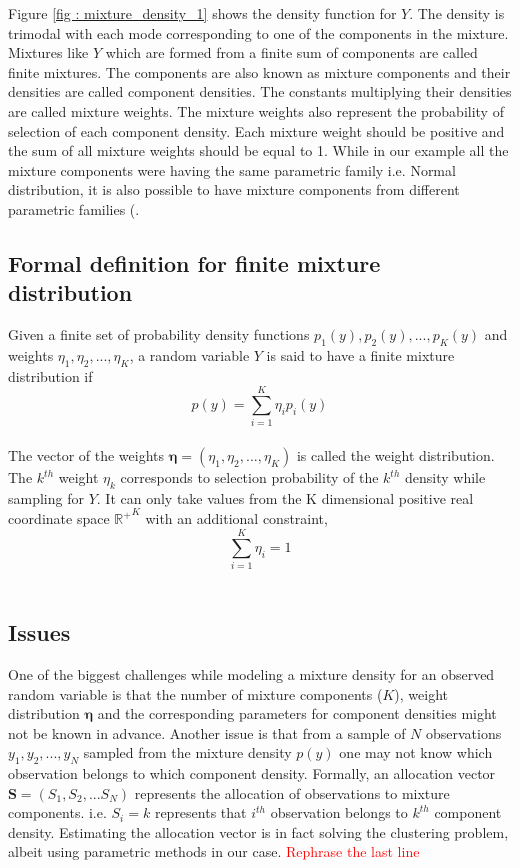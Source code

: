 Figure \ref{fig : mixture_density_1} shows the density function for $Y$. The density is trimodal with each mode corresponding to one of the components in the mixture. Mixtures like $Y$ which are formed from a finite sum of components are called finite mixtures. The components are also known as mixture components and their densities are called component densities. The constants multiplying their densities are called mixture weights. The mixture weights also represent the probability of selection of each component density. Each mixture weight should be positive and the sum of all mixture weights should be equal to 1. While in our example all the  mixture components were having the same parametric family i.e. Normal distribution, it is also possible to have mixture components from different parametric families (\citealp[pg. 4]{fruhwirth-schnatter_finite_2013}. 

\subsection{Formal definition for finite mixture distribution}
Given a finite set of probability density functions $p_1(y), p_2(y), ... , p_K(y)$ and weights $\eta_1, \eta_2, ... , \eta_K$, a random variable $Y$ is said to have a finite mixture distribution if\\
$$p(y) = \sum_{i=1}^{K} \eta_{i} p_{i}(y)$$\\
The vector of the weights $\boldsymbol{\eta} = (\eta_1, \eta_2, ... , \eta_K)$ is called the weight distribution. The $k^{th}$ weight $\eta_{k}$ corresponds to selection probability of the $k^{th}$ density while sampling for $Y$. It can only take values from the K dimensional positive real coordinate space ${\mathbb{R}^{+}}^K$ with an additional constraint,\\
$$\sum_{i=1}^{K} \eta_{i} = 1$$\\


\subsection{Issues}
\label{subsec : issues_mixture_density}
One of the biggest challenges while modeling a mixture density for an observed random variable is that the number of mixture components ($K$), weight distribution $\boldsymbol{\eta}$ and the corresponding parameters for component densities might not be known in advance. Another issue is that from a sample of $N$ observations $y_1, y_2, ..., y_N$ sampled from the mixture density $p(y)$ one may not know which observation belongs to which component density. Formally, an allocation vector $\boldsymbol{S} = (S_1, S_2,...S_N)$ represents the allocation of observations to mixture components. i.e. $S_i = k$ represents that $i^{th}$ observation belongs to $k^{th}$ component density. Estimating the allocation vector is in fact solving the clustering problem, albeit using parametric methods in our case. \textcolor{red}{Rephrase the last line}

